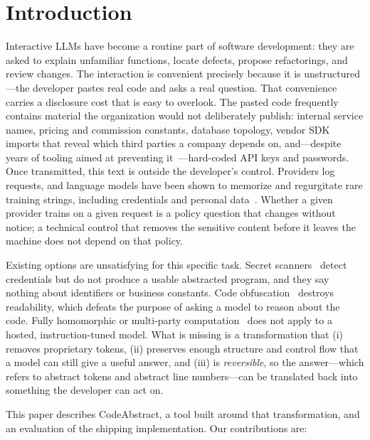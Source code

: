 \documentclass[conference]{IEEEtran}
\begin{document}
\section{Introduction}

Interactive LLMs have become a routine part of software development: they
are asked to explain unfamiliar functions, locate defects, propose
refactorings, and review changes. The interaction is convenient precisely
because it is unstructured---the developer pastes real code and asks a
real question. That convenience carries a disclosure cost that is easy to
overlook. The pasted code frequently contains material the organization
would not deliberately publish: internal service names, pricing and
commission constants, database topology, vendor SDK imports that reveal
which third parties a company depends on, and---despite years of tooling
aimed at preventing it~\cite{meli2019git,sinha2015detecting,gitleaks,trufflehog}---hard-coded
API keys and passwords. Once transmitted, this text is outside the
developer's control. Providers log requests, and language models have been
shown to memorize and regurgitate rare training strings, including
credentials and personal data~\cite{carlini2021extracting,carlini2023quantifying,yang2024memorization,lukas2023analyzing}.
Whether a given provider trains on a given request is a policy question
that changes without notice; a technical control that removes the
sensitive content before it leaves the machine does not depend on that
policy.

Existing options are unsatisfying for this specific task. Secret
scanners~\cite{gitleaks,trufflehog} detect credentials but do not produce
a usable abstracted program, and they say nothing about identifiers or
business constants. Code obfuscation~\cite{collberg1997taxonomy} destroys
readability, which defeats the purpose of asking a model to reason about
the code. Fully homomorphic or multi-party
computation~\cite{yao1982protocols} does not apply to a hosted,
instruction-tuned model. What is missing is a transformation that (i)
removes proprietary tokens, (ii) preserves enough structure and control
flow that a model can still give a useful answer, and (iii) is
\emph{reversible}, so the answer---which refers to abstract tokens and
abstract line numbers---can be translated back into something the
developer can act on.

This paper describes CodeAbstract, a tool built around that
transformation, and an evaluation of the shipping implementation. Our
contributions are:
\end{document}
